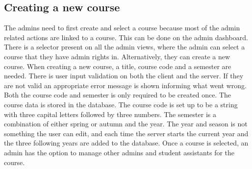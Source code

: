 \subsection{Creating a new course}
The admins need to first create and select a course because most of the admin related actions are linked to a course. This can be done on the admin dashboard. There is a selector present on all the admin views, where the admin can select a course that they have admin rights in. Alternatively, they can create a new course. When creating a new course, a title, course code and a semester are needed. There is user input validation on both the client and the server. If they are not valid an appropriate error message is shown informing what went wrong. Both the course code and semester is only required to be created once. The course data is stored in the database. The course code is set up to be a string with three capital letters followed by three numbers.  The semester is a combination of either spring or autumn and the year. The year and season is not something the user can edit, and each time the server starts the current year and the three following years are added to the database. Once a course is selected, an admin has the option to manage other admins and student assistants for the course.